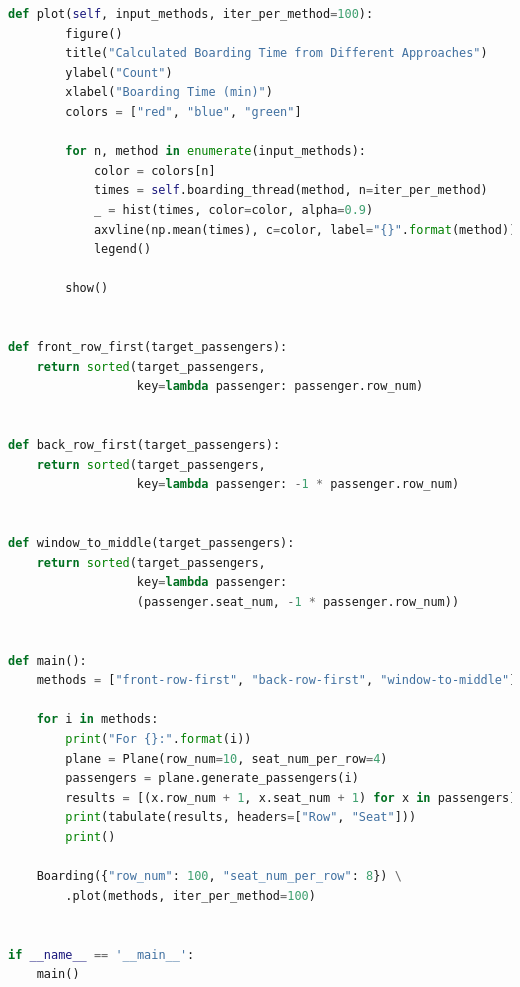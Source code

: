 \documentclass[12pt]{article}
\begin{document}
\begin{lstlisting}[language=python]
    def plot(self, input_methods, iter_per_method=100):
        figure()
        title("Calculated Boarding Time from Different Approaches")
        ylabel("Count")
        xlabel("Boarding Time (min)")
        colors = ["red", "blue", "green"]

        for n, method in enumerate(input_methods):
            color = colors[n]
            times = self.boarding_thread(method, n=iter_per_method)
            _ = hist(times, color=color, alpha=0.9)
            axvline(np.mean(times), c=color, label="{}".format(method))
            legend()

        show()


def front_row_first(target_passengers):
    return sorted(target_passengers,
                  key=lambda passenger: passenger.row_num)


def back_row_first(target_passengers):
    return sorted(target_passengers,
                  key=lambda passenger: -1 * passenger.row_num)


def window_to_middle(target_passengers):
    return sorted(target_passengers,
                  key=lambda passenger:
                  (passenger.seat_num, -1 * passenger.row_num))


def main():
    methods = ["front-row-first", "back-row-first", "window-to-middle"]

    for i in methods:
        print("For {}:".format(i))
        plane = Plane(row_num=10, seat_num_per_row=4)
        passengers = plane.generate_passengers(i)
        results = [(x.row_num + 1, x.seat_num + 1) for x in passengers]
        print(tabulate(results, headers=["Row", "Seat"]))
        print()

    Boarding({"row_num": 100, "seat_num_per_row": 8}) \
        .plot(methods, iter_per_method=100)


if __name__ == '__main__':
    main()
\end{lstlisting}
\end{document}
